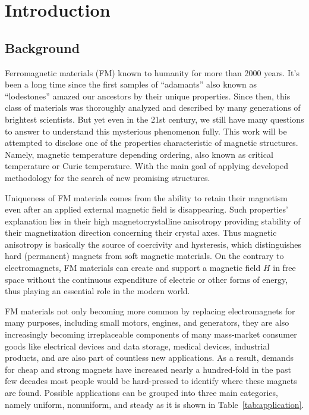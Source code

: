 \chapter{Introduction}

\section{Background}
Ferromagnetic materials (FM) known to humanity for more than 2000 years. It's been a long time since the first samples of “adamants” also known as “lodestones” amazed our ancestors by their unique properties. Since then, this class of materials was thoroughly analyzed and described by many generations of brightest scientists. But yet even in the 21st century, we still have many questions to answer to understand this mysterious phenomenon fully. This work will be attempted to disclose one of the properties characteristic of magnetic structures. Namely, magnetic temperature depending ordering, also known as critical temperature or Curie temperature. With the main goal of applying developed methodology for the search of new promising structures.


Uniqueness of FM materials comes from the ability to retain their magnetism even after an applied external magnetic field is disappearing.
Such properties' explanation lies in their high magnetocrystalline anisotropy providing stability of their magnetization direction concerning their crystal axes. 
Thus magnetic anisotropy is basically the source of coercivity and hysteresis, which distinguishes hard (permanent) magnets from soft magnetic materials.
On the contrary to electromagnets, FM materials can create and support a magnetic field $H$ in free space without the continuous expenditure of electric or other forms of energy, thus playing an essential role in the modern world.

FM materials not only becoming more common by replacing electromagnets for many purposes, including small motors, engines, and generators, they are also increasingly becoming irreplaceable components of many mass-market consumer goods like electrical devices and data storage, medical devices, industrial products, and are also part of countless new applications.
As a result, demands for cheap and strong magnets have increased nearly a hundred-fold in the past few decades most people would be hard-pressed to identify where these magnets are found.
Possible applications can be grouped into three main categories, namely uniform, nonuniform, and steady as it is shown in Table~\ref{tab:application}.

